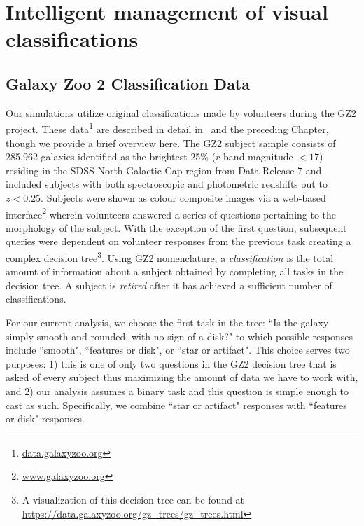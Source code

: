 
\chapter{Intelligent management of visual classifications}
\label{chap:3}


\section{Galaxy Zoo 2 Classification Data} \label{sec: data}

Our simulations utilize original classifications made by volunteers during the GZ2 project. These data\footnote{\url{data.galaxyzoo.org}} are described in detail in~\cite{Willett2013} and the preceding Chapter, though we provide a brief overview here.  The GZ2 subject sample consists of 285,962 galaxies identified as the brightest 25\% ($r$-band magnitude $< 17$) residing in the SDSS North Galactic Cap region from Data Release 7 and included subjects with both spectroscopic and photometric redshifts out to $z < 0.25$. Subjects were shown as colour composite images via a web-based interface\footnote{\url{www.galaxyzoo.org}} wherein volunteers answered a series of questions pertaining to the morphology of the subject. With the exception of the first question, subsequent queries were dependent on volunteer responses from the previous task creating a complex decision tree\footnote{A visualization of this decision tree can be found at \url{https://data.galaxyzoo.org/gz_trees/gz_trees.html}}. Using GZ2 nomenclature, a \textit{classification} is the total amount of information about a subject obtained by completing all tasks in the decision tree. A subject is \textit{retired} after it has achieved a sufficient number of classifications.


For our current analysis, we choose the first task in the tree: ``Is the galaxy simply smooth and rounded, with no sign of a disk?" to which possible responses include ``smooth", ``features or disk", or ``star or artifact". This choice serves two purposes: 1) this is one of only two questions in the GZ2 decision tree that is asked of every subject thus maximizing the amount of data we have to work with, and 2) our analysis assumes a binary task and this question is simple enough to cast as such. Specifically, we combine ``star or artifact" responses with ``features or disk" responses.

